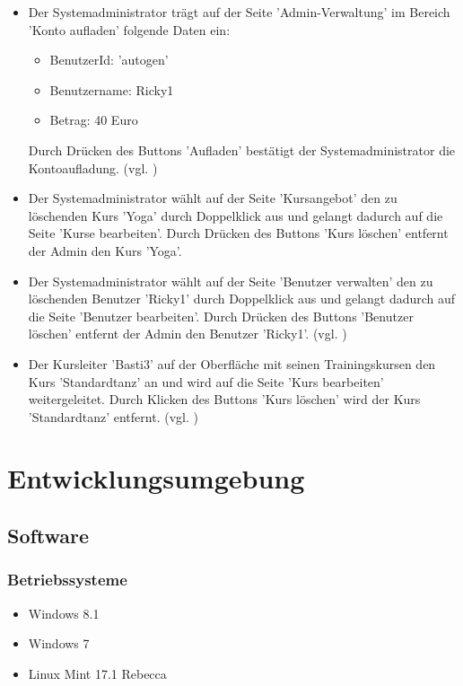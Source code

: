 \documentclass[a4paper]{scrreprt}
\begin{document}
\begin{itemize}
				\item {}
				Der Systemadministrator trägt auf der Seite 'Admin-Verwaltung' im Bereich 'Konto aufladen' folgende Daten ein:
					\begin{itemize}
						\item BenutzerId: 'autogen'
						\item Benutzername: Ricky1
						\item Betrag: 40 Euro
					\end{itemize}
				Durch Drücken des Buttons 'Aufladen' bestätigt der Systemadministrator die Kontoaufladung. (vgl. )
				
				\item {}
				Der Systemadministrator wählt auf der Seite 'Kursangebot' den zu löschenden Kurs 'Yoga' durch Doppelklick aus und gelangt dadurch auf die Seite 'Kurse bearbeiten'. Durch Drücken des Buttons 'Kurs löschen' entfernt der Admin den Kurs 'Yoga'.
				
				
				\item {}
				Der Systemadministrator wählt auf der Seite 'Benutzer verwalten' den zu löschenden Benutzer 'Ricky1' durch Doppelklick aus und gelangt dadurch auf die Seite 'Benutzer bearbeiten'. Durch Drücken des Buttons 'Benutzer löschen' entfernt der Admin den Benutzer 'Ricky1'. (vgl. )
				
				\item {}
				Der Kursleiter 'Basti3' auf der Oberfläche mit seinen Trainingskursen den Kurs 'Standardtanz' an und wird auf die Seite 'Kurs bearbeiten' weitergeleitet. Durch Klicken des Buttons 'Kurs löschen' wird der Kurs 'Standardtanz' entfernt. (vgl. )
				
			\end{itemize}





\chapter{Entwicklungsumgebung}
    \section{Software}
        \subsection{Betriebssysteme}
            \begin{itemize}
            	\item Windows 8.1
            	\item Windows 7
            	\item Linux Mint 17.1 Rebecca
            \end{itemize}	
            
\end{document}
